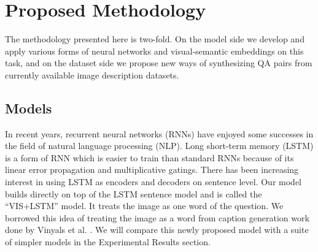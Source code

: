 \documentclass{article} %
\renewcommand{\#}[1]{\textbf{#1}}
\begin{document}
\section{Proposed Methodology}

The methodology presented here is two-fold. On the model side we develop and
apply various forms of neural networks and visual-semantic embeddings on this
task, and on the dataset side we propose new ways of synthesizing QA pairs from
currently available image description datasets.

\subsection{Models}

In recent years, recurrent neural networks (RNNs) have enjoyed some successes
in the field of natural language processing (NLP). Long short-term memory
(LSTM) \cite{hochreiter97} is a form of RNN which is easier to train than
standard RNNs because of its linear error propagation and multiplicative
gatings. There has been increasing interest in using LSTM as encoders and
decoders on sentence level. Our model builds directly on top of the LSTM
sentence model and is called the ``VIS+LSTM'' model. It treats the image as one
word of the question. We borrowed this idea of treating the image as a word
from caption generation work done by Vinyals et al. \cite{vinyals14}. We will
compare this newly proposed model with a suite of simpler models in the
Experimental Results section.
\end{document}
